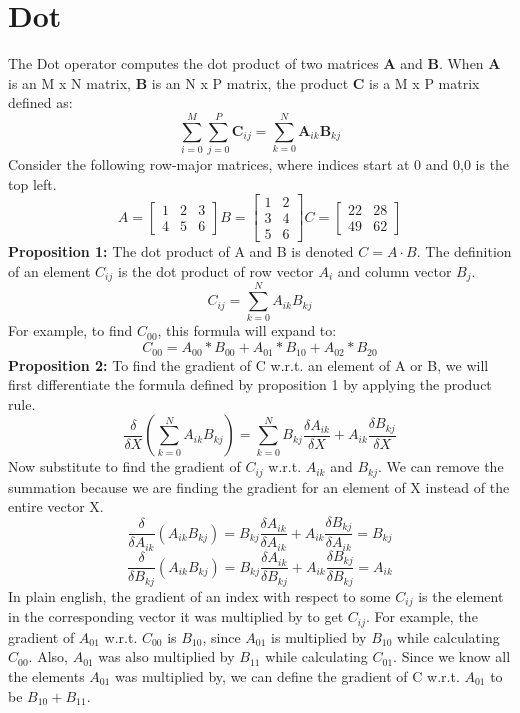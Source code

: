 \documentclass{article}
\begin{document}
    \section{Dot}
        The Dot operator computes the dot product of two matrices \textbf{A} and \textbf{B}. When \textbf{A} is an M x N 
        matrix, \textbf{B} is an N x P matrix, the product \textbf{C} is a M x P matrix defined as: 
        $$\sum_{i=0}^{M}\sum_{j=0}^{P}\boldsymbol{C}_{ij} = \sum_{k=0}^{N} \boldsymbol{A}_{ik}\boldsymbol{B}_{kj}$$
        Consider the following row-major matrices, where indices start at 0 and 0,0 is the top left. 
        $$
            A = \begin{bmatrix}1 & 2 & 3\\ 4 & 5 & 6 \end{bmatrix}
            B = \begin{bmatrix}1 & 2 \\ 3 & 4 \\ 5 & 6 \end{bmatrix}
            C = \begin{bmatrix} 22 & 28 \\ 49 & 62\end{bmatrix}
        $$
        \textbf{Proposition 1:}
        The dot product of A and B is denoted $C = A \cdot B$. The definition of an element $C_{ij}$ is the dot product of row vector $A_i$ and column vector $B_j$. 
        $$C_{ij} = \sum_{k=0}^{N} A_{ik}B_{kj}$$
        For example, to find $C_{00}$, this formula will expand to:
        $$C_{00} = A_{00} * B_{00} + A_{01} * B_{10} + A_{02} * B_{20}$$
        \textbf{Proposition 2:}
        To find the gradient of C w.r.t. an element of A or B, we will first differentiate the formula defined by proposition 1 by applying the product rule.
        $$\frac{\delta}{\delta{X}}(\sum_{k=0}^{N}A_{ik} B_{kj}) = \sum_{k=0}^{N} B_{kj} \frac{\delta{A_{ik}}}{\delta{X}} + A_{ik} \frac{\delta{B_{kj}}}{\delta{X}}$$ 
        Now substitute to find the gradient of $C_{ij}$ w.r.t. $A_{ik}$ and $B_{kj}$. We can remove the summation because we are finding the gradient for an element of X instead of the entire vector X. 
        $$\frac{\delta}{\delta{A_{ik}}}(A_{ik} B_{kj}) = B_{kj} \frac{\delta{A_{ik}}}{\delta{A_{ik}}} + A_{ik} \frac{\delta{B_{kj}}}{\delta{A_{ik}}} = B_{kj}$$ 
        $$\frac{\delta}{\delta{B_{kj}}}(A_{ik} B_{kj}) = B_{kj} \frac{\delta{A_{ik}}}{\delta{B_{kj}}} + A_{ik} \frac{\delta{B_{kj}}}{\delta{B_{kj}}} = A_{ik}$$ 
        In plain english, the gradient of an index with respect to some $C_{ij}$ is the element in the corresponding vector it was multiplied by to get $C_{ij}$.  For example, the gradient
        of $A_{01}$ w.r.t. $C_{00}$ is $B_{10}$, since $A_{01}$ is multiplied by $B_{10}$ while calculating $C_{00}$. Also, $A_{01}$ was also multiplied by $B_{11}$ while calculating
        $C_{01}$. Since we know all the elements $A_{01}$ was multiplied by, we can define the gradient of C w.r.t. $A_{01}$ to be $B_{10} + B_{11}$. 
\end{document}

